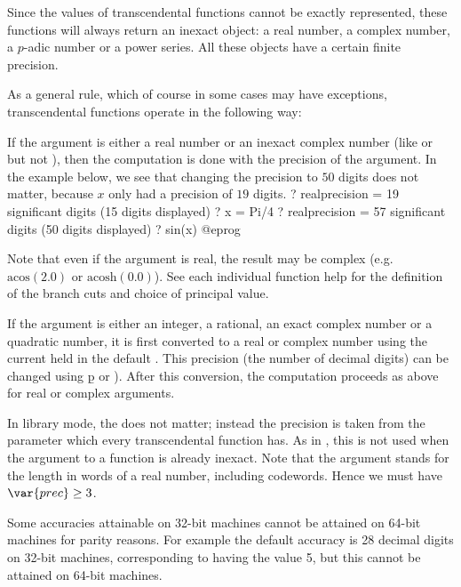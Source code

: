 Since the values of transcendental functions cannot be exactly represented,
these functions will always return an inexact object: a real number,
a complex number, a $p$-adic number or a power series.  All these objects
have a certain finite precision.

As a general rule, which of course in some cases may have exceptions,
transcendental functions operate in the following way:

\item If the argument is either a real number or an inexact complex number
(like  or  but not ), then the
computation is done with the precision of the argument.
In the example below, we see that changing the precision to $50$ digits does
not matter, because $x$ only had a precision of $19$ digits.
\bprog
? 
   realprecision = 19 significant digits (15 digits displayed)
? x = Pi/4
? 
   realprecision = 57 significant digits (50 digits displayed)
? sin(x)
@eprog

Note that even if the argument is real, the result may be complex
(e.g.~$\text{acos}(2.0)$ or $\text{acosh}(0.0)$). See each individual
function help for the definition of the branch cuts and choice of principal
value.

\item If the argument is either an integer, a rational, an exact complex
number or a quadratic number, it is first converted to a real
or complex number using the current  held in the default
.  This precision (the number of decimal digits) can be
changed using \b{p} or ).
After this conversion, the computation proceeds as above for real or complex
arguments.

In library mode, the  does not matter; instead the
precision is taken from the  parameter which every transcendental
function has.  As in , this  is not used when the
argument to a function is already inexact.
Note that the argument  stands for the length in words of a real
number, including codewords. Hence we must have $\var{prec} \geq 3$.

Some accuracies attainable on 32-bit machines cannot be attained
on 64-bit machines for parity reasons. For example the default  accuracy
is 28 decimal digits on 32-bit machines, corresponding to  having
the value 5, but this cannot be attained on 64-bit machines.

